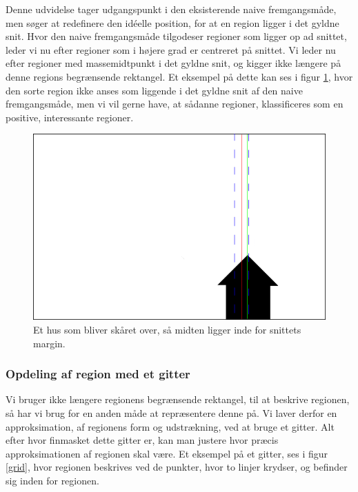 {
Denne udvidelse tager udgangspunkt i den eksisterende naive
fremgangsmåde, men søger at redefinere den idéelle position, for at en
region ligger i det gyldne snit. Hvor den naive fremgangsmåde tilgodeser
regioner som ligger op ad snittet, leder vi nu efter regioner som i
højere grad er centreret på snittet. Vi leder nu efter regioner med
massemidtpunkt i det gyldne snit, og kigger ikke længere på denne
regions begrænsende rektangel. Et eksempel på dette kan ses i
figur \ref{hus}, hvor den sorte region ikke anses som liggende i det
gyldne snit af den naive fremgangsmåde, men vi vil gerne have, at sådanne
regioner, klassificeres som en positive, interessante regioner.

\begin{figure}[h]
	\begin{center}
		\includegraphics[scale=0.3,angle=0]{afsnit/vores_implementation/billeder/udvidet_loesning/husworks.png}
	\end{center}
	\caption[]{Et hus som bliver skåret over, så midten ligger inde for
    snittets margin.}
	\label{hus}
\end{figure}

\subsubsection{Opdeling af region med et gitter}
Vi bruger ikke længere regionens begrænsende rektangel, til at beskrive
regionen, så har vi brug for en anden måde at repræsentere denne på. Vi
laver derfor en approksimation, af regionens form og udstrækning, ved at
bruge et gitter.  Alt efter hvor finmasket dette gitter er, kan man
justere hvor præcis approksimationen af regionen skal være. Et eksempel
på et gitter, ses i figur \ref{grid}, hvor regionen beskrives ved de
punkter, hvor to linjer krydser, og befinder sig inden for regionen.

}
